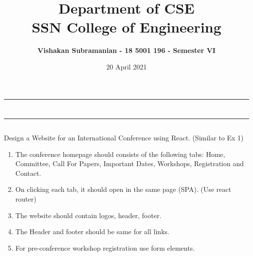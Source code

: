 \documentclass[12pt, a4]{article}
\title{\textbf{Department of CSE\\SSN College of Engineering}}
\author{\textbf{Vishakan Subramanian - 18 5001 196 - Semester VI}}
\date{20 April 2021}
\begin{document}
\maketitle
\hrule
\section*{}
\hrule
\bigskip

\subsection*{}
\subsection*{}
\begin{flushleft}
Design a Website for an International Conference using React. (Similar to Ex 1)

\begin{enumerate}
\item The conference homepage should consists of the following tabs:
Home, Committee, Call For Papers, Important Dates, Workshops,
Registration and Contact.
\item On clicking each tab, it should open in the same page (SPA). (Use react
router)
\item The website should contain logos, header, footer.
\item The Header and footer should be same for all links.
\item For pre-conference workshop registration use form elements.
\end{enumerate}
 
\end{flushleft}

\newpage
\subsection*{}
\begin{flushleft}

\end{flushleft}

\newpage
\subsection*{}
\begin{flushleft}

\end{flushleft}
\end{document}
